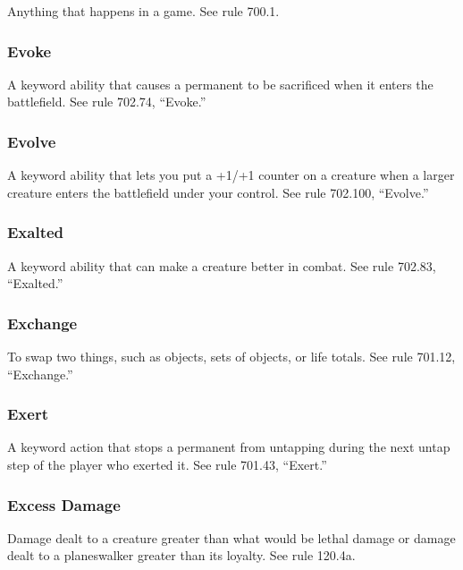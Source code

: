 {{{{{{{{{Anything that happens in a game. See rule 700.1.

\subsubsection*{Evoke}

A keyword ability that causes a permanent to be sacrificed when it enters the battlefield. See rule 702.74, “Evoke.”

\subsubsection*{Evolve}

A keyword ability that lets you put a +1/+1 counter on a creature when a larger creature enters the battlefield under your control. See rule 702.100, “Evolve.”

\subsubsection*{Exalted}

A keyword ability that can make a creature better in combat. See rule 702.83, “Exalted.”

\subsubsection*{Exchange}

To swap two things, such as objects, sets of objects, or life totals. See rule 701.12, “Exchange.”

\subsubsection*{Exert}

A keyword action that stops a permanent from untapping during the next untap step of the player who exerted it. See rule 701.43, “Exert.”

\subsubsection*{Excess Damage}

Damage dealt to a creature greater than what would be lethal damage or damage dealt to a planeswalker greater than its loyalty. See rule 120.4a.

}}}}}}}}}
